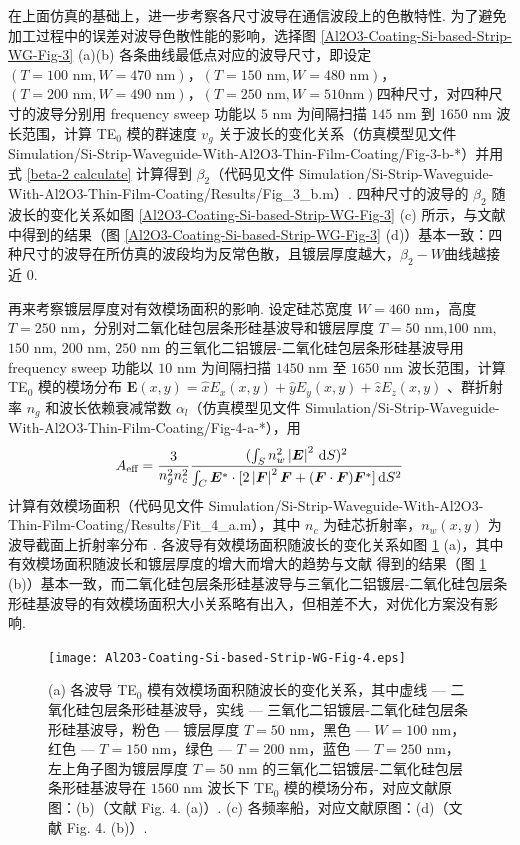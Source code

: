 \documentclass[zh]{assignment}
\begin{document}
在上面仿真的基础上，进一步考察各尺寸波导在通信波段上的色散特性. 为了避免加工过程中的误差对波导色散性能的影响，选择图 \ref{Al2O3-Coating-Si-based-Strip-WG-Fig-3} (a)(b) 各条曲线最低点对应的波导尺寸，即设定$(T=100\text{ nm},W=470\text{ nm})$，$(T=150\text{ nm},W=480\text{ nm})$，$(T=200\text{ nm},W=490\text{ nm})$，$(T=250\text{ nm},W=510\text{nm})$四种尺寸，对四种尺寸的波导分别用 frequency sweep 功能以 $5$ nm 为间隔扫描 $145$ nm 到 $1650$ nm 波长范围，计算 TE$_0$ 模的群速度 $v_g$ 关于波长的变化关系（仿真模型见文件 Simulation/Si-Strip-Waveguide-With-Al2O3-Thin-Film-Coating/Fig-3-b-*）并用式 \eqref{beta-2 calculate} 计算得到 $\beta_2$（代码见文件 Simulation/Si-Strip-Waveguide-With-Al2O3-Thin-Film-Coating/Results/Fig\_3\_b.m）. 四种尺寸的波导的 $\beta_2$ 随波长的变化关系如图 \ref{Al2O3-Coating-Si-based-Strip-WG-Fig-3} (c) 所示，与文献 \cite{guo2018experimentally} 中得到的结果（图 \ref{Al2O3-Coating-Si-based-Strip-WG-Fig-3} (d)）基本一致：四种尺寸的波导在所仿真的波段均为反常色散，且镀层厚度越大，$\beta_2-W$曲线越接近 $0$.

再来考察镀层厚度对有效模场面积的影响. 设定硅芯宽度 $W=460$ nm，高度 $T=250$ nm，分别对二氧化硅包层条形硅基波导和镀层厚度 $T=50$ nm,$100$ nm, $150$ nm, $200$ nm, $250$ nm 的三氧化二铝镀层-二氧化硅包层条形硅基波导用 frequency sweep 功能以 $10$ nm 为间隔扫描 $1450$ nm 至 $1650$ nm 波长范围，计算 TE$_0$ 模的模场分布 $\bm{E}(x,y)=\hat{x}E_x(x,y)+\hat{y}E_y(x,y)+\hat{z}E_z(x,y)$ 、群折射率 $n_g$ 和波长依赖衰减常数 $\alpha_l$（仿真模型见文件 Simulation/Si-Strip-Waveguide-With-Al2O3-Thin-Film-Coating/Fig-4-a-*），用
\begin{align}
    A_{\text{eff}}=\frac{3}{n_g^2n_c^2}\frac{(\int_Sn_w^2\left\lvert\bm{E}\right\rvert^2\,\mathrm{d}S)^2}{\int_C\bm{E}^*\cdot[2\left\lvert\bm{F}\right\rvert^2\bm{F}+(\bm{F}\cdot\bm{F})\bm{F}^*]\,\mathrm{d}S^2}
\end{align}
计算有效模场面积（代码见文件 Simulation/Si-Strip-Waveguide-With-Al2O3-Thin-Film-Coating/Results/Fit\_4\_a.m），其中 $n_c$ 为硅芯折射率，$n_w(x,y)$ 为波导截面上折射率分布 \cite{guo2017full}. 各波导有效模场面积随波长的变化关系如图 \ref{Al2O3-Coating-Si-based-Strip-WG-Fig-4} (a)，其中有效模场面积随波长和镀层厚度的增大而增大的趋势与文献 \cite{guo2018experimentally} 得到的结果（图 \ref{Al2O3-Coating-Si-based-Strip-WG-Fig-4} (b)）基本一致，而二氧化硅包层条形硅基波导与三氧化二铝镀层-二氧化硅包层条形硅基波导的有效模场面积大小关系略有出入，但相差不大，对优化方案没有影响.

\begin{figure}[ht]
    \centering
    \texttt{[image: Al2O3-Coating-Si-based-Strip-WG-Fig-4.eps]}
    \caption{(a) 各波导 TE$_0$ 模有效模场面积随波长的变化关系，其中虚线 --- 二氧化硅包层条形硅基波导，实线 --- 三氧化二铝镀层-二氧化硅包层条形硅基波导，粉色 --- 镀层厚度 $T=50$ nm，黑色 --- $W=100$ nm，红色 --- $T=150$ nm，绿色 --- $T=200$ nm，蓝色 --- $T=250$ nm，左上角子图为镀层厚度 $T=50$ nm 的三氧化二铝镀层-二氧化硅包层条形硅基波导在 $1560$ nm 波长下 TE$_0$ 模的模场分布，对应文献原图：(b)（文献 \cite{guo2018experimentally} Fig. 4. (a)）. (c) 各频率船，对应文献原图：(d)（文献 \cite{guo2018experimentally} Fig. 4. (b)）.}
    \label{Al2O3-Coating-Si-based-Strip-WG-Fig-4}
\end{figure}
\end{document}
